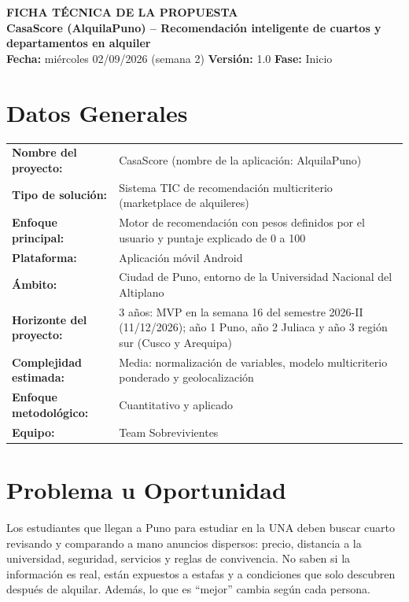 \documentclass[11pt,a4paper]{article}
\begin{document}
\begin{center}
    {\Large \textbf{\textcolor{AzulUNA}{FICHA TÉCNICA DE LA PROPUESTA}}}\\[3pt]
    {\normalsize \textbf{CasaScore (AlquilaPuno) -- Recomendación inteligente de cuartos y departamentos en alquiler}}\\[4pt]
    \footnotesize \textbf{Fecha:} miércoles 02/09/2026 (semana 2) \quad \textbar\quad \textbf{Versión:} 1.0 \quad \textbar\quad \textbf{Fase:} Inicio
\end{center}

\vspace{0.1cm}

\section{Datos Generales}
\noindent\begin{tabularx}{\textwidth}{@{}P{4.2cm} L@{}}
\toprule
\textbf{Nombre del proyecto:} & CasaScore (nombre de la aplicación: AlquilaPuno) \\
\textbf{Tipo de solución:} & Sistema TIC de recomendación multicriterio (marketplace de alquileres) \\
\textbf{Enfoque principal:} & Motor de recomendación con pesos definidos por el usuario y puntaje explicado de 0 a 100 \\
\textbf{Plataforma:} & Aplicación móvil Android \\
\textbf{Ámbito:} & Ciudad de Puno, entorno de la Universidad Nacional del Altiplano \\
\textbf{Horizonte del proyecto:} & 3 años: MVP en la semana 16 del semestre 2026-II (11/12/2026); año 1 Puno, año 2 Juliaca y año 3 región sur (Cusco y Arequipa) \\
\textbf{Complejidad estimada:} & Media: normalización de variables, modelo multicriterio ponderado y geolocalización \\
\textbf{Enfoque metodológico:} & Cuantitativo y aplicado \\
\textbf{Equipo:} & Team Sobrevivientes \\
\bottomrule
\end{tabularx}

\section{Problema u Oportunidad}
Los estudiantes que llegan a Puno para estudiar en la UNA deben buscar cuarto revisando y comparando a mano anuncios dispersos: precio, distancia a la universidad, seguridad, servicios y reglas de convivencia. No saben si la información es real, están expuestos a estafas y a condiciones que solo descubren después de alquilar. Además, lo que es ``mejor'' cambia según cada persona.
\end{document}
